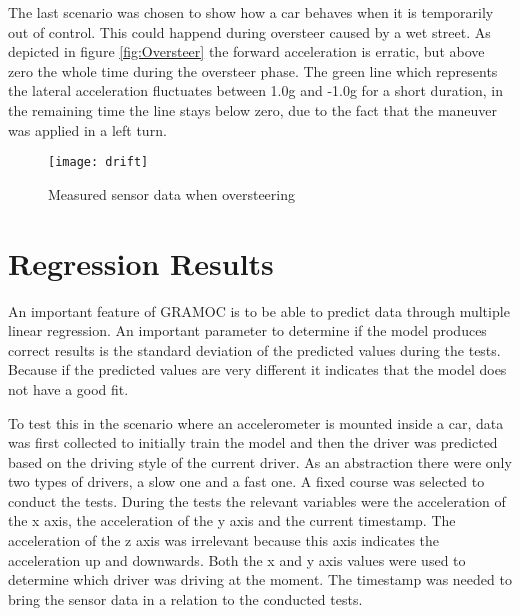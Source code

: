 The last scenario was chosen to show how a car behaves when it is temporarily out of control. This could happend during oversteer caused by a wet street. As depicted in figure \vref{fig:Oversteer} the forward acceleration is erratic, but above zero the whole time during the oversteer phase. The green line which represents the lateral acceleration fluctuates between 1.0g and -1.0g for a short duration, in the remaining time the line stays below zero, due to the fact that the maneuver was applied in a left turn.

\begin{figure}[H]
    \centering
    \texttt{[image: drift]}
    \caption{Measured sensor data when oversteering}
    \label{fig:Oversteer}
\end{figure}

\section{Regression Results}




An important feature of GRAMOC is to be able to predict data through multiple linear regression. An important parameter to determine if the model produces correct results is the standard deviation of the predicted values during the tests. Because if the predicted values are very different it indicates that the model does not have a good fit.


To test this in the scenario where an accelerometer is mounted inside a car, data was first collected to initially train the model and then the driver was predicted based on the driving style of the current driver. As an abstraction there were only two types of drivers, a slow one and a fast one. A fixed course was selected to conduct the tests. During the tests the relevant variables were the acceleration of the x axis, the acceleration of the y axis and the current timestamp. The acceleration of the z axis was irrelevant because this axis indicates the acceleration up and downwards. Both the x and y axis values were used to determine which driver was driving at the moment. The timestamp was needed to bring the sensor data in a relation to the conducted tests.

